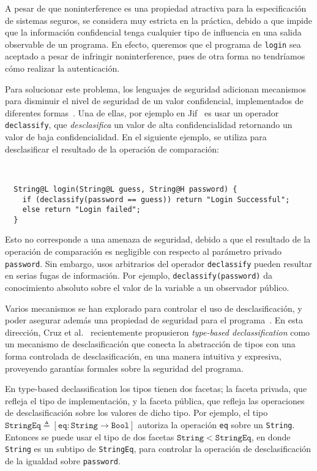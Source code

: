 A pesar de que noninterference es una propiedad atractiva para la especificación de sistemas seguros, se considera muy estricta en la práctica, debido a que impide que la información confidencial tenga cualquier tipo de influencia en una salida observable de un programa. En efecto, queremos que el programa de \texttt{login} sea aceptado a pesar de infringir noninterference, pues de otra forma no tendríamos cómo realizar la autenticación.

Para solucionar este problema, los lenguajes de seguridad adicionan mecanismos para disminuir el nivel de seguridad de un valor confidencial, implementados de diferentes formas~\cite{sabelfeldSands:JCS09}. Una de ellas, por ejemplo en Jif~\cite{jif} es usar un operador \texttt{declassify}, que \emph{desclasifica} un valor de alta confidencialidad retornando un valor de baja confidencialidad. En el siguiente ejemplo, se utiliza para desclasificar el resultado de la operación de comparación:

\begin{ej} \ \\
  \normalfont
  \label{ej2-2}
\begin{lstlisting}
  String@L login(String@L guess, String@H password) {
    if (declassify(password == guess)) return "Login Successful";
    else return "Login failed";
  }
\end{lstlisting}
\end{ej}



Esto no corresponde a una amenaza de seguridad, debido a que el resultado de la operación de comparación es negligible con respecto al parámetro privado \texttt{password}. Sin embargo, usos arbitrarios del operador \texttt{declassify} pueden resultar en serias fugas de información. Por ejemplo, \texttt{declassify(password)} da conocimiento absoluto sobre el valor de la variable a un observador público.

Varios mecanismos se han explorado para controlar el uso de desclasificación, y poder asegurar además una propiedad de seguridad para el programa~\cite{sabelfeldSands:JCS09}. En esta dirección, Cruz et al.~\cite{cruzAl:ecoop2017} recientemente propusieron \emph{type-based declassification} como un mecanismo de desclasificación que conecta la abstracción de tipos con una forma controlada de desclasificación, en una manera intuitiva y expresiva, proveyendo garantías formales sobre la seguridad del programa.

En type-based declassification los tipos tienen dos facetas; la faceta privada, que refleja el tipo de implementación, y la faceta pública, que refleja las operaciones de desclasificación sobre los valores de dicho tipo. Por ejemplo, el tipo $\mathtt{StringEq} \triangleq [\mathtt{eq} : \mathtt{String} \rightarrow \mathtt{Bool}]$ autoriza la operación \texttt{eq} sobre un \texttt{String}. Entonces se puede usar el tipo de dos facetas $\mathtt{String} < \mathtt{StringEq}$, en donde \texttt{String} es un subtipo de \texttt{StringEq}, para controlar la operación de desclasificación de la igualdad sobre \texttt{password}.

